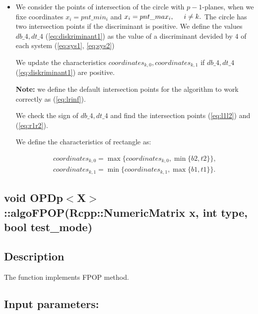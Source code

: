 \documentclass{report}
\begin{document}
\begin{itemize}
	
	\item We consider the points of intersection of the circle with $p-1$-planes, when we fixe coordinates   $x_i = pnt\_min_i$ and $x_i = pnt\_max_i, \hspace*{5mm} i \neq k.$  The circle has two intersection points  if the discriminant is positive. We define the values $db\_4, dt\_4$ (\ref{eq:diskriminant1}) as the value of a discriminant devided by  $4$ of each system (\ref{eq:sys1}, \ref{eq:sys2})  
	
	 We update the characteristics $coordinates_{k,0}, coordinates_{k,1}$ if $db\_4, dt\_4$ (\ref{eq:diskriminant1}) are positive.
	
	{\bfseries Note:} we define the default intersection points for the algorithm to work correctly as (\ref{eq:lrinf}).
	
	We check the sign of $db\_4, dt\_4$ and find the intersection points (\ref{eq:l1l2}) and (\ref{eq:r1r2}).
	
	We define the characteristics of rectangle as:
	
	\begin{equation}
		\begin{gathered}
			coordinates_{k,0} = \max\{coordinates_{k,0}, \min\{b2, t2\}\},\\
			coordinates_{k,1} = \min\{coordinates_{k,1}, \max\{b1, t1\}\}.
		\end{gathered}
	\end{equation}
\end{itemize}	


\label{algoFPOP}
\begin{center} 
	\section*{\bfseries void OPDp$<$X$>$::algoFPOP(Rcpp::NumericMatrix x, int type, bool test\_mode)}
\end{center} 

\subsection*{Description}

	The function implements FPOP method.

\subsection*{Input parameters:}
\end{document}
